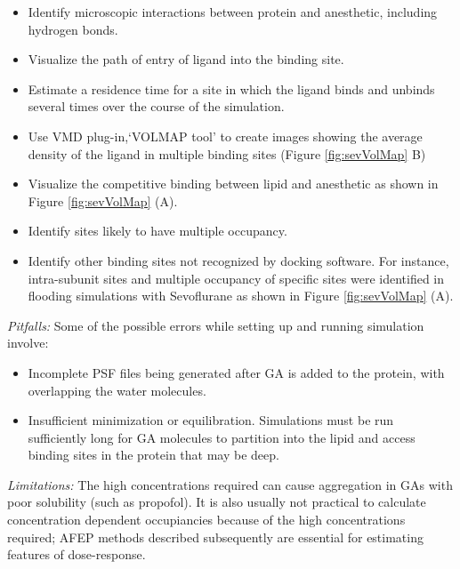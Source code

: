 \documentclass[12pt]{article}
\begin{document}
	\begin{itemize}
	 \item Identify microscopic interactions between protein and anesthetic, including hydrogen bonds.  
	 \item Visualize the path of entry of ligand into the binding site.
	 \item Estimate a residence time for a site in which the ligand binds and unbinds several times over the course of the simulation. 
	 \item Use VMD plug-in,`VOLMAP tool'  to create images showing the average density of the ligand in multiple binding sites (Figure \ref{fig:sevVolMap} B)
	 \item Visualize the competitive binding between lipid and anesthetic as shown in Figure \ref{fig:sevVolMap} (A). 
	 \item Identify sites likely to have multiple occupancy.  
	 \item Identify other binding sites not recognized by docking software. For instance, intra-subunit sites and multiple occupancy of specific sites were identified in flooding simulations with Sevoflurane as shown in Figure \ref{fig:sevVolMap} (A).
	\end{itemize}

\textit {Pitfalls:}
	Some of the possible errors while setting up and running simulation involve:
	\begin{itemize}
	 \item Incomplete PSF files being generated after GA is added to the protein, with overlapping the water molecules. 
	 \item Insufficient minimization or equilibration. Simulations must be run sufficiently long for GA molecules to partition into the lipid and access binding sites in the protein that may be deep.  
	 \end{itemize}

 \textit {Limitations:}
 The high concentrations required can cause aggregation in GAs with poor solubility (such as propofol). It is also usually not practical to calculate concentration dependent occupiancies because of the high concentrations required; AFEP methods described subsequently are essential for estimating features of dose-response.  
 
\end{document}
